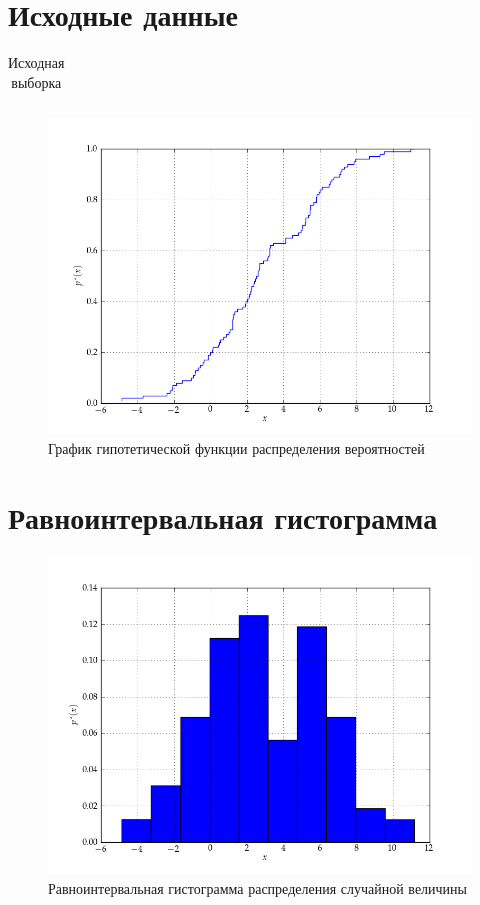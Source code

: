 \documentclass[a4paper,12pt]{report}
\begin{document}
\section*{Исходные данные}

\begin{table}[h!]
  \renewcommand{\tabcolsep}{0.9em}
  \centering
  \begin{tabular}{cccccccccc}
    
  \end{tabular}
  \caption{Исходная выборка}
\end{table}

\begin{figure}[h!] 
  \centering
  \includegraphics[width=0.8\linewidth]{../pic/sample.png}
  \caption{График гипотетической функции распределения вероятностей}
\end{figure}

\newpage

\section*{Равноинтервальная гистограмма}

\begin{figure}[h!] 
  \centering
  \includegraphics[width=0.8\linewidth]{../pic/stat_series_eq_size.png}
  \caption{Равноинтервальная гистограмма распределения случайной величины}
\end{figure}
\end{document}
